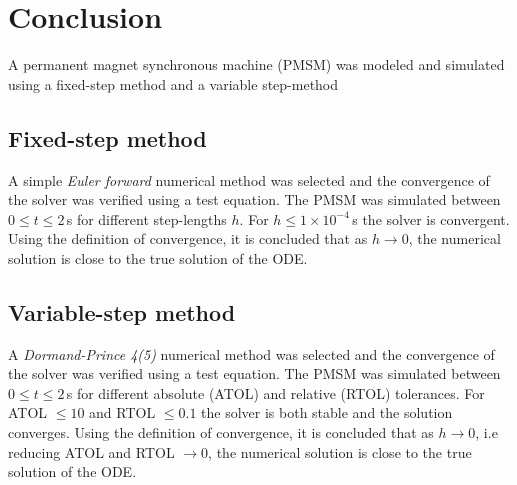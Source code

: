 \section{Conclusion}
A permanent magnet synchronous machine (PMSM) was modeled and simulated using a fixed-step method and a variable step-method
\subsection{Fixed-step method}
A simple \textit{Euler forward} numerical method was selected and the convergence of the solver was verified using a test equation. The PMSM was simulated between $ 0\leq t \leq 2$\,s for different step-lengths $h$. For $h \leq 1\times10^{-4}$\,s the solver is convergent. Using the definition of convergence, it is concluded that as $h\rightarrow0$, the numerical solution is close to the true solution of the ODE.
\subsection{Variable-step method}
A \textit{Dormand-Prince 4(5)} numerical method was selected and the convergence of the solver was verified using a test equation. The PMSM was simulated between $ 0\leq t \leq 2$\,s for different absolute (ATOL) and relative (RTOL) tolerances. For ATOL $\leq 10$ and RTOL $\leq 0.1$ the solver is both stable and the solution converges. Using the definition of convergence, it is concluded that as $h\rightarrow0$, i.e reducing ATOL and RTOL $\rightarrow 0$, the numerical solution is close to the true solution of the ODE.


